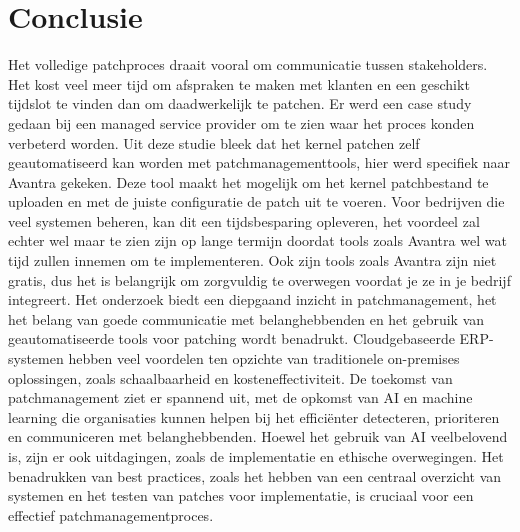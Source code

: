 
\chapter{Conclusie}%
\label{ch:conclusie}


Het volledige patchproces draait vooral om communicatie tussen stakeholders. Het kost veel meer tijd om afspraken te maken met klanten en een geschikt tijdslot te vinden dan om daadwerkelijk te patchen. Er werd een 
case study gedaan bij een managed service provider om te zien waar het proces konden verbeterd worden. Uit deze studie bleek dat het kernel patchen zelf geautomatiseerd kan worden
met patchmanagementtools, hier werd specifiek naar Avantra gekeken. Deze tool maakt het mogelijk om het kernel patchbestand te uploaden en met de juiste configuratie de patch uit te voeren. Voor bedrijven die veel systemen beheren, kan dit een tijdsbesparing opleveren, het voordeel zal echter wel maar te zien zijn op lange termijn doordat tools zoals Avantra wel wat tijd zullen innemen om te implementeren.  
Ook zijn tools zoals Avantra zijn niet gratis, dus het is belangrijk om zorgvuldig te overwegen voordat je ze in je bedrijf integreert.
Het onderzoek biedt een diepgaand inzicht in patchmanagement, het het belang van goede communicatie met belanghebbenden en het gebruik van geautomatiseerde tools voor patching wordt benadrukt. Cloudgebaseerde ERP-systemen 
hebben veel voordelen ten opzichte van traditionele on-premises oplossingen, zoals schaalbaarheid en kosteneffectiviteit. De toekomst
van patchmanagement ziet er spannend uit, met de opkomst van AI en machine learning die organisaties kunnen helpen bij het efficiënter detecteren, prioriteren en communiceren met belanghebbenden. Hoewel het gebruik van AI veelbelovend is, zijn er ook uitdagingen, zoals de implementatie en ethische overwegingen.
Het benadrukken van best practices, zoals het hebben van een centraal overzicht van systemen en het testen van patches voor implementatie, is cruciaal voor een effectief patchmanagementproces.
